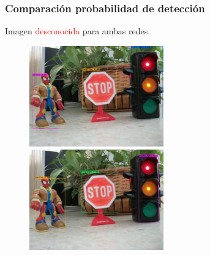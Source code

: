 \documentclass{beamer}
\begin{document}
\begin{frame}
	\frametitle{Comparación probabilidad de detección}
	\begin{outline}
		\1 Imagen \textcolor{red}{desconocida} para ambas redes.
	\end{outline}
	\begin{figure}
		\centering
		\includegraphics[width=5.8cm]{figs/predictionsoriginal}\hspace{0.1cm}
		\includegraphics[width=5.8cm]{figs/predictionscustom}
	\end{figure}
\end{frame}
\end{document}
